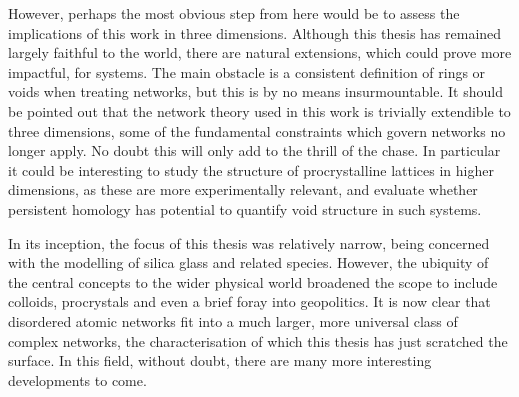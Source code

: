 However, perhaps the most obvious step from here would be to assess the implications of this work in three dimensions.
Although this thesis has remained largely faithful to the \td{} world, there are natural extensions, which could prove more impactful, for \thd{} systems.
The main obstacle is a consistent definition of rings or voids when treating \thd{} networks, but this is by no means insurmountable. 
It should be pointed out that the network theory used in this work is trivially extendible to three dimensions, some of the fundamental constraints which govern \td{} networks no longer apply.
No doubt this will only add to the thrill of the chase.
In particular it could be interesting to study the structure of procrystalline lattices in higher dimensions, as these are more experimentally relevant, and evaluate whether persistent homology has potential to quantify void structure in such systems.

In its inception, the focus of this thesis was relatively narrow, being concerned with the modelling of \td{} silica glass and related species.
However, the ubiquity of the central concepts to the wider physical world broadened the scope to include colloids, procrystals and even a brief foray into geopolitics.
It is now clear that disordered \td{} atomic networks fit into a much larger, more universal class of complex networks, the characterisation of which this thesis has just scratched the surface.
In this field, without doubt, there are many more interesting developments to come.



